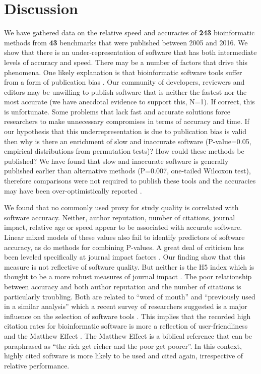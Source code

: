 \documentclass[fleqn,10pt]{SelfArx} %
\begin{document}
\section*{Discussion}

We have gathered data on the relative speed and accuracies of \textbf{{\color{black}243}} bioinformatic methods from \textbf{{\color{black}43}} benchmarks that were published between 2005 and 2016. We show that there is an under-representation of software that has both intermediate levels of accuracy and speed. There may be a number of factors that drive this phenomena. One likely explanation is that bioinformatic software tools suffer from a form of publication bias \cite{Boulesteix2015-am}. Our community of developers, reviewers and editors may be unwilling to publish software that is neither the fastest nor the most accurate (we have anecdotal evidence to support this, N=1). If correct, this is unfortunate. Some problems that lack fast and accurate solutions force researchers to make unnecessary compromises in terms of accuracy and time. If our hypothesis that this underrepresentation is due to publication bias is valid then why is there an enrichment of slow and inaccurate software (P-value=0.05, empirical distributions from permutation tests)? How could these methods be published? We have found that slow and inaccurate software is generally published earlier than alternative methods (P=0.007, one-tailed Wilcoxon test), therefore comparisons were not required to publish these tools and the accuracies may have been over-optimistically reported \cite{Boulesteix2015-nc}.

We found that no commonly used proxy for study quality is correlated with software accuracy. Neither, author reputation, number of citations, journal impact, relative age or speed appear to be associated with accurate software. Linear mixed models of these values also fail to identify predictors of software accuracy, as do methods for combining P-values. A great deal of criticism has been leveled specifically at journal impact factors \cite{Editors2006-ue,Rossner2007-yk,Lariviere2010-kx}. Our finding show that this measure is not reflective of software quality. But neither is the H5 index which is thought to be a more robust measures of journal impact \cite{Harzing2008-wb}. The poor relationship between accuracy and both author reputation and the number of citations is particularly troubling. Both are related to “word of mouth” and “previously used in a similar analysis” which a recent survey of researchers suggested is a major influence on the selection of software tools \cite{Loman2015-bw}. This implies that the recorded high citation rates for bioinformatic software  \cite{Perez-Iratxeta2007-lv,Van_Noorden2014-kc,Wren2016-xy} is more a reflection of user-friendliness and the Matthew Effect \cite{Lariviere2010-kx,Merton1968-cb}. The Matthew Effect is a biblical reference that can be paraphrased as “the rich get richer and the poor get poorer”. In this context, highly cited software is more likely to be used and cited again, irrespective of relative performance. 
\end{document}
